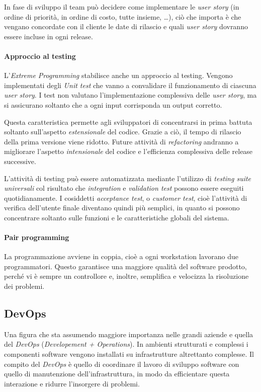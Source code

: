 \documentclass[12pt, a4paper]{report}
\theoremstyle{def}
\theoremstyle{definition}
\begin{document}
In fase di sviluppo il team può decidere come implementare le \emph{user story}
(in ordine di priorità, in ordine di costo, tutte insieme, \dots), ciò che importa
è che vengano concordate con il cliente le date di rilascio e quali
\emph{user story} dovranno essere incluse in ogni release.

\paragraph{Approccio al testing}
L'\emph{Extreme Programming} stabilisce anche un approccio al testing. Vengono
implementati degli \emph{Unit test} che vanno a convalidare il funzionamento di
ciascuna \emph{user story}. I test non valutano l'implementazione complessiva
delle \emph{user story}, ma si assicurano soltanto che a ogni input corrisponda
un output corretto.

Questa caratteristica permette agli sviluppatori di concentrarsi in prima battuta
soltanto sull'aspetto \emph{estensionale} del codice. Grazie a ciò, il tempo di
rilascio della prima versione viene ridotto. Future attività di \emph{refactoring}
andranno a migliorare l'aspetto \emph{intensionale} del codice e l'efficienza
complessiva delle release successive.

L'attività di testing può essere automatizzata mediante l'utilizzo di
\emph{testing suite universali} col risultato che \emph{integration} e
\emph{validation test} possono essere eseguiti quotidianamente. I cosiddetti
\emph{acceptance test}, o \emph{customer test}, cioè l'attività di verifica
dell'utente finale diventano quindi più semplici, in quanto si possono
concentrare soltanto sulle funzioni e le caratteristiche globali del sistema.

\paragraph{Pair programming}
La programmazione avviene in coppia, cioè a ogni workstation lavorano due
programmatori. Questo garantisce una maggiore qualità del software prodotto,
perché vi è sempre un controllore e, inoltre, semplifica e velocizza la
risoluzione dei problemi.

\subsection{DevOps}
Una figura che sta assumendo maggiore importanza nelle grandi aziende e quella
del \emph{DevOps} (\emph{Developement + Operations}). In ambienti strutturati e
complessi i componenti software vengono installati su infrastrutture altrettanto
complesse. Il compito del \emph{DevOps} è quello di coordinare il lavoro di
sviluppo software con quello di manutenzione dell'infrastruttura, in modo da
efficientare questa interazione e ridurre l'insorgere di problemi.
\end{document}
